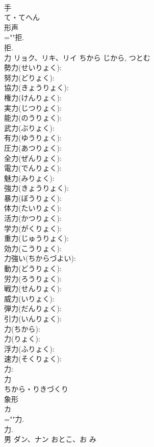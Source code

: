 \documentclass[8pt]{extreport}
\begin{document}
\begin{CJK}{UTF8}{min}
\\	手	
\\	て・てへん	
\\	形声 
\\	=""拒.
\\	拒.
\\	力	リョク、リキ、リイ	ちから	じから, つとむ	
\\	勢力(せいりょく): 
\\	努力(どりょく): 
\\	協力(きょうりょく): 
\\	権力(けんりょく): 
\\	実力(じつりょく): 
\\	能力(のうりょく): 
\\	武力(ぶりょく): 
\\	有力(ゆうりょく): 
\\	圧力(あつりょく): 
\\	全力(ぜんりょく): 
\\	電力(でんりょく): 
\\	魅力(みりょく): 
\\	強力(きょうりょく): 
\\	暴力(ぼうりょく): 
\\	体力(たいりょく): 
\\	活力(かつりょく): 
\\	学力(がくりょく): 
\\	重力(じゅうりょく): 
\\	効力(こうりょく): 
\\	力強い(ちからづよい): 
\\	動力(どうりょく): 
\\	労力(ろうりょく): 
\\	戦力(せんりょく): 
\\	威力(いりょく): 
\\	弾力(だんりょく): 
\\	引力(いんりょく): 
\\	力(ちから): 
\\	力(りょく): 
\\	浮力(ふりょく): 
\\	速力(そくりょく): 
\\	力: 
\\	力	
\\	ちから・りきづくり	
\\	象形 
\\	カ 
\\	=""力.
\\	力.
\\	男	ダン、ナン	おとこ、お	み	

\end{CJK}
\end{document}
